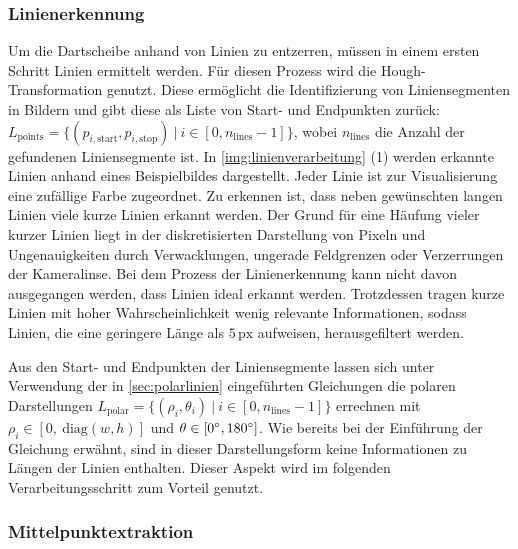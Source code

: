 \subsubsection{Linienerkennung}
\label{sec:linienerkennung}

Um die Dartscheibe anhand von Linien zu entzerren, müssen in einem ersten Schritt Linien ermittelt werden. Für diesen Prozess wird die Hough-Transformation genutzt. Diese ermöglicht die Identifizierung von Liniensegmenten in Bildern und gibt diese als Liste von Start- und Endpunkten zurück: $L_\text{points} = \{(p_{i, \text{start}}, p_{i, \text{stop}})\ \vert \ i \in [0, n_\text{lines}-1]\}$, wobei $n_\text{lines}$ die Anzahl der gefundenen Liniensegmente ist. In \autoref{img:linienverarbeitung} (1) werden erkannte Linien anhand eines Beispielbildes dargestellt. Jeder Linie ist zur Visualisierung eine zufällige Farbe zugeordnet. Zu erkennen ist, dass neben gewünschten langen Linien viele kurze Linien erkannt werden. Der Grund für eine Häufung vieler kurzer Linien liegt in der diskretisierten Darstellung von Pixeln und Ungenauigkeiten durch Verwacklungen, ungerade Feldgrenzen oder Verzerrungen der Kameralinse. Bei dem Prozess der Linienerkennung kann nicht davon ausgegangen werden, dass Linien ideal erkannt werden. Trotzdessen tragen kurze Linien mit hoher Wahrscheinlichkeit wenig relevante Informationen, sodass Linien, die eine geringere Länge als $5\,\text{px}$ aufweisen, herausgefiltert werden.

Aus den Start- und Endpunkten der Liniensegmente lassen sich unter Verwendung der in \autoref{sec:polarlinien} eingeführten Gleichungen die polaren Darstellungen $L_\text{polar} = \{(\rho_i, \theta_i)\ |\ i \in [0, n_\text{lines}-1]\}$ errechnen mit $\rho_i \in [0,\ \text{diag}(w, h)]$ und $\theta \in [0^{\circ}, 180^{\circ}]$. Wie bereits bei der Einführung der Gleichung erwähnt, sind in dieser Darstellungsform keine Informationen zu Längen der Linien enthalten. Dieser Aspekt wird im folgenden Verarbeitungsschritt zum Vorteil genutzt.

\subsubsection{Mittelpunktextraktion}
\label{sec:mittelpunktextraktion}

